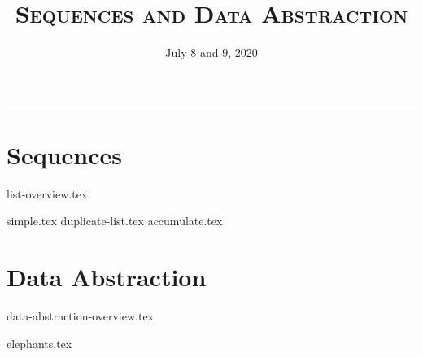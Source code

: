 \documentclass{exam}
\title{\textsc{Sequences and Data Abstraction}}
\date{July 8 and 9, 2020}
\begin{document}
\maketitle
\rule{\textwidth}{0.15em}
\fontsize{12}{15}\selectfont


\section{Sequences}
{list-overview.tex}
\begin{questions}
{simple.tex}
{duplicate-list.tex}
\newpage
{accumulate.tex}
\end{questions}


\newpage
\section{Data Abstraction}
{data-abstraction-overview.tex}
\begin{questions}
\newpage
{elephants.tex}
\end{questions}
\end{document}
